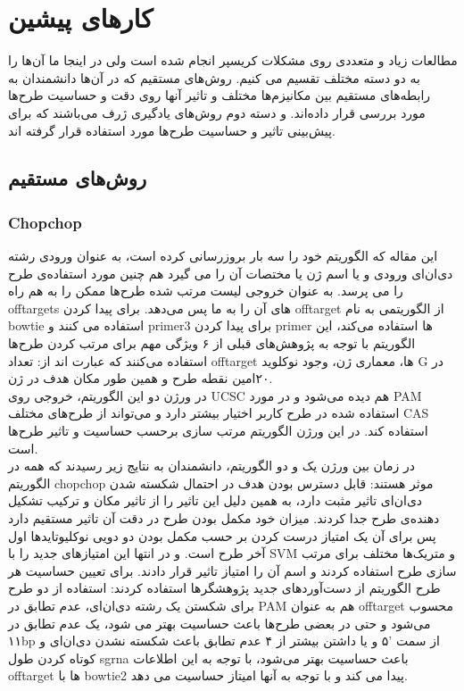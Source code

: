 \documentclass[12pt,a4paper,BCOR=.7cm,headsepline,bibliography=totoc]{report}
\begin{document}
\chapter{کارهای پیشین}
مطالعات زیاد و متعددی روی مشکلات کریسپر انجام شده است ولی در اینجا ما آن‌ها را به دو دسته مختلف تقسیم می کنیم. روش‌های مستقیم که در آن‌ها دانشمندان به رابطه‌های مستقیم بین مکانیزم‌ها مختلف و تاثیر آنها روی دقت و حساسیت طرح‌ها مورد بررسی قرار داده‌اند. و دسته دوم روش‌های یادگیری ژرف می‌باشند که برای پیش‌بینی تاثیر و حساسیت طرح‌ها مورد استفاده قرار گرفته اند.
\section{روش‌های مستقیم}
\subsection{Chopchop ~\cite{CHOPCHOP3,CHOPCHOP2,CHOPCHOP}}
این مقاله که الگوریتم خود را سه بار بروزرسانی کرده است، به عنوان ورودی رشته دی‌ان‌ای ورودی و یا اسم ژن یا مختصات آن را می گیرد هم چنین مورد استفاده‌ی طرح را می پرسد. به عنوان خروجی لیست مرتب شده طرح‌ها ممکن را به هم راه offtargets های آن را به ما پس می‌دهد. برای پیدا کردن offtarget از الگوریتمی به نام bowtie استفاده می کنند و primer3 برای پیدا کردن primer ها استفاده می‌کند، این الگوریتم با توجه به پژوهش‌های قبلی از ۶ ویژگی مهم برای مرتب کردن طرح‌ها استفاده می‌کنند که عبارت اند از: تعداد offtarget ها، معماری ژن،  وجود نوکلوید G در ۲۰امین نقطه طرح و همین طور مکان هدف در ژن. \\
در ورژن دو این الگوریتم، خروجی روی UCSC هم دیده می‌شود و در مورد PAM استفاده شده در طرح کاربر اختیار بیشتر دارد و می‌تواند از طرح‌های مختلف CAS استفاده کند. در این ورژن الگوریتم مرتب سازی برحسب حساسیت و تاثیر طرح‌ها است.\\
در زمان بین ورژن یک و دو الگوریتم، دانشمندان به نتایج زیر رسیدند که همه در الگوریتم chopchop موثر هستند: قابل دسترس بودن هدف در احتمال شکسته شدن دی‌ان‌ای تاثیر مثبت دارد، به همین دلیل این تاثیر را از تاثیر مکان و ترکیب تشکیل دهنده‌ی طرح جدا کردند.
میزان خود مکمل بودن طرح در دقت آن تاثیر مستقیم دارد پس برای آن یک امتیاز درست کردن بر حسب مکمل بودن دو دویی نوکلیوتاید‌ها اول آخر طرح است. و در انتها این امتیاز‌های جدید را با SVM و متریک‌ها مختلف برای مرتب سازی طرح استفاده کردند و اسم آن را امتیاز تاثیر قرار دادند.
برای تعیین حساسیت هر طرح الگوریتم از دست‌آورد‌های جدید پژوهشگر‌ها استفاده کردند: استفاده از دو طرح برای شکستن یک رشته دی‌ان‌ای، عدم تطابق در PAM هم به عنوان offtarget محسوب می‌شود و حتی در بعضی طرح‌ها باعث حساسیت بهتر می شود، یک عدم تطابق در ۱۱bp از سمت ‍'۵ و یا داشتن بیشتر از ۴ عدم تطابق باعث شکسته نشدن  دی‌ان‌ای و کوتاه کردن طول sgrna باعث حساسیت بهتر می‌شود، با توجه به این اطلاعات offtarget ها با bowtie2 پیدا می کند و با توجه به آنها امیتاز حساسیت می دهد.
\end{document}
